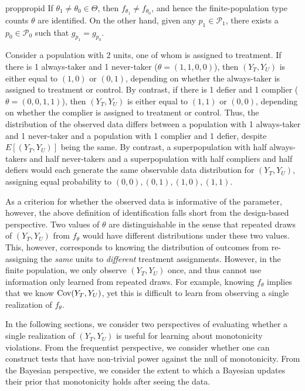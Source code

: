 \documentclass[12pt,reqno]{amsart}
\begin{document}
\begin{restatable}{prop}{propid}
\label{prop:id}
If $\theta_1 \neq \theta_0 \in \Theta$, then $f_{\theta_1} \neq f_{\theta_0}$, and hence the finite-population type counts $\theta$ are identified. On the
other hand, given any $p_1 \in \mathcal P_1$, there exists a $p_0 \in \mathcal P_0$ such
that $g_{p_1} = g_{p_0}$. 
\end{restatable}

\begin{example} \label{ex:2 units}
Consider a population with 2 units, one of whom is assigned to treatment. If there is 1 always-taker and 1 never-taker ($\theta = (1,1,0,0)$), then $(Y_T,Y_U)$ is either equal to $(1,0)$ or $(0,1)$, depending on whether the always-taker is assigned to treatment or control. By contrast, if there is 1 defier and 1 complier ($\theta = (0,0,1,1)$), then $(Y_T,Y_U)$ is either equal to $(1,1)$ or $(0,0)$, depending on whether the complier is assigned to treatment or control. Thus, the distribution of the observed data differs between a population with 1 always-taker and 1 never-taker and a population with 1 complier and 1 defier, despite $E[(Y_T,Y_U)]$ being the same. By contrast, a superpopulation with half always-takers and half never-takers and a superpopulation with half compliers and half defiers would each generate the same observable data distribution for $(Y_T,Y_U)$, assigning equal probability to $(0,0), (0,1), (1,0), (1,1)$. 
\end{example}


As a criterion for whether the observed data is informative of the parameter, however, the
above definition of identification falls short from the design-based perspective. Two
values of $\theta$ are distinguishable in the sense that repeated draws of $(Y_T, Y_U)$
from $f_\theta$ would have different distributions under these two values. This, however,
corresponds to knowing the distribution of outcomes from re-assigning the \emph{same}
units to \emph{different} treatment assignments. However, in the finite population, we only
observe $(Y_T, Y_U)$ once, and thus cannot use information only learned from repeated
draws. For example, knowing $f_\theta$ implies that we know $\operatorname{Cov}(Y_T,Y_U)$, yet this is
difficult to learn from observing a {single} realization of $f_\theta$.

In the following sections, we consider two perspectives of evaluating whether a single realization of $(Y_T,Y_U)$ is useful for learning about monotonicity violations. From the frequentist perspective, we consider whether one can construct tests that have non-trivial power against the null of monotonicity. From the Bayesian perspective, we consider the extent to which a Bayesian updates their prior that monotonicity holds after seeing the data. 
\end{document}
